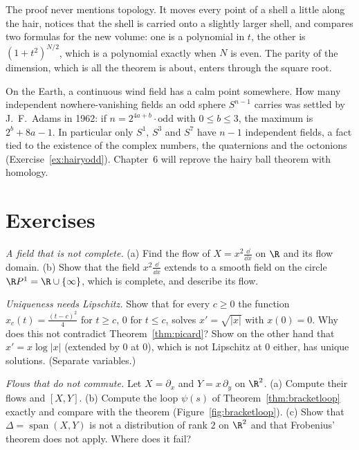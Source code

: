 \begin{beauty}
The proof never mentions topology. It moves every point of a shell a little along the hair, notices that the shell is carried onto a slightly larger
shell, and compares two formulas for the new volume: one is a polynomial in $t$, the other is $(1+t^2)^{N/2}$, which is a polynomial exactly when $N$ is
even. The parity of the dimension, which is all the theorem is about, enters through the square root.
\end{beauty}

\begin{remark}
On the Earth, a continuous wind field has a calm point somewhere. How many independent nowhere-vanishing fields an odd sphere $S^{n-1}$ carries was
settled by J.~F.~Adams in 1962: if $n=2^{4a+b}\cdot\text{odd}$ with $0\le b\le3$, the maximum is $2^b+8a-1$. In particular only $S^1$, $S^3$ and $S^7$ have
$n-1$ independent fields, a fact tied to the existence of the complex numbers, the quaternions and the octonions (Exercise~\ref{ex:hairyodd}).
Chapter~6 will reprove the hairy ball theorem with homology.
\end{remark}

\section{Exercises}

\begin{exercise}[$\star$]\label{ex:noncomplete}
\emph{A field that is not complete.} (a) Find the flow of $X=x^2\frac{\dd}{\dd x}$ on $\R$ and its flow domain. (b) Show that the field $x^2\frac{\dd}{\dd x}$
extends to a smooth field on the circle $\R P^1=\R\cup\{\infty\}$, which is complete, and describe its flow.
\end{exercise}

\begin{exercise}[$\star$]\label{ex:sqrtuniqueness}
\emph{Uniqueness needs Lipschitz.} Show that for every $c\ge0$ the function $x_c(t)=\frac{(t-c)^2}4$ for $t\ge c$, $0$ for $t\le c$, solves $x'=\sqrt{|x|}$ with
$x(0)=0$. Why does this not contradict Theorem~\ref{thm:picard}? Show on the other hand that $x'=x\log|x|$ (extended by $0$ at $0$), which is not Lipschitz
at $0$ either, has unique solutions. (Separate variables.)
\end{exercise}

\begin{exercise}[$\star$]\label{ex:noncommute}
\emph{Flows that do not commute.} Let $X=\partial_x$ and $Y=x\,\partial_y$ on $\R^2$. (a) Compute their flows and $[X,Y]$. (b) Compute the loop $\psi(s)$ of
Theorem~\ref{thm:bracketloop} exactly and compare with the theorem (Figure~\ref{fig:bracketloop}). (c) Show that $\Delta=\operatorname{span}(X,Y)$ is not a
distribution of rank $2$ on $\R^2$ and that Frobenius' theorem does not apply. Where does it fail?
\end{exercise}

